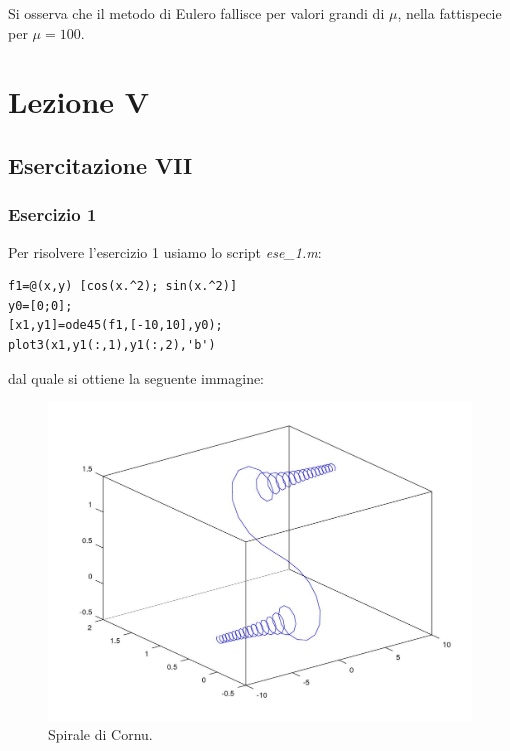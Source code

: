 \documentclass[11pt,a4paper,twoside,openright,titlepage,
headinclude,footinclude,BCOR5mm,
numbers=noenddot,cleardoublepage=empty,
tablecaptionabove]{scrbook}
\begin{document}
\newpage
Si osserva che il metodo di Eulero fallisce per valori grandi di $\mu$, nella fattispecie
per $\mu=100$.

\chapter{Lezione V}
\section{Esercitazione VII}
\subsection{Esercizio 1}
Per risolvere l'esercizio 1 usiamo lo script \emph{ese\_1.m}:
\begin{lstlisting}[frame = trBL]
f1=@(x,y) [cos(x.^2); sin(x.^2)]
y0=[0;0];
[x1,y1]=ode45(f1,[-10,10],y0);
plot3(x1,y1(:,1),y1(:,2),'b')
\end{lstlisting}
dal quale si ottiene la seguente immagine:
\begin{center}
\begin{figure}[h!]
\includegraphics[width=\textwidth]{figs/spirali.jpg}
\caption{Spirale di Cornu.}
\end{figure}
\end{center}


\newpage
\end{document}
